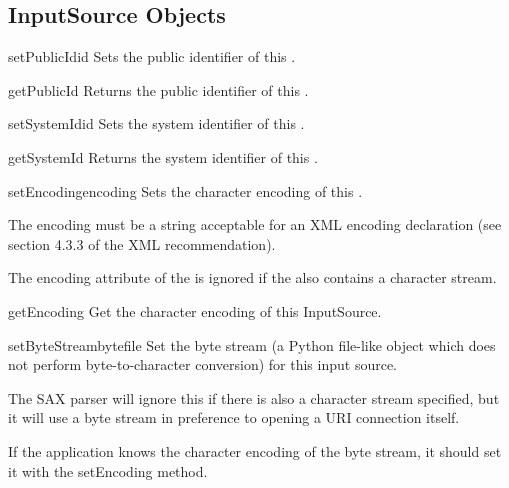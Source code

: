 \subsection{InputSource Objects \label{input-source-objects}}

\begin{methoddesc}[InputSource]{setPublicId}{id}
  Sets the public identifier of this .
\end{methoddesc}

\begin{methoddesc}[InputSource]{getPublicId}{}
  Returns the public identifier of this .
\end{methoddesc}

\begin{methoddesc}[InputSource]{setSystemId}{id}
  Sets the system identifier of this .
\end{methoddesc}

\begin{methoddesc}[InputSource]{getSystemId}{}
  Returns the system identifier of this .
\end{methoddesc}

\begin{methoddesc}[InputSource]{setEncoding}{encoding}
  Sets the character encoding of this .

  The encoding must be a string acceptable for an XML encoding
  declaration (see section 4.3.3 of the XML recommendation).
 
  The encoding attribute of the  is ignored if the
   also contains a character stream.
\end{methoddesc}

\begin{methoddesc}[InputSource]{getEncoding}{}
  Get the character encoding of this InputSource.
\end{methoddesc}

\begin{methoddesc}[InputSource]{setByteStream}{bytefile}
  Set the byte stream (a Python file-like object which does not
  perform byte-to-character conversion) for this input source.
  
  The SAX parser will ignore this if there is also a character stream
  specified, but it will use a byte stream in preference to opening a
  URI connection itself.
  
  If the application knows the character encoding of the byte stream,
  it should set it with the setEncoding method.
\end{methoddesc}

